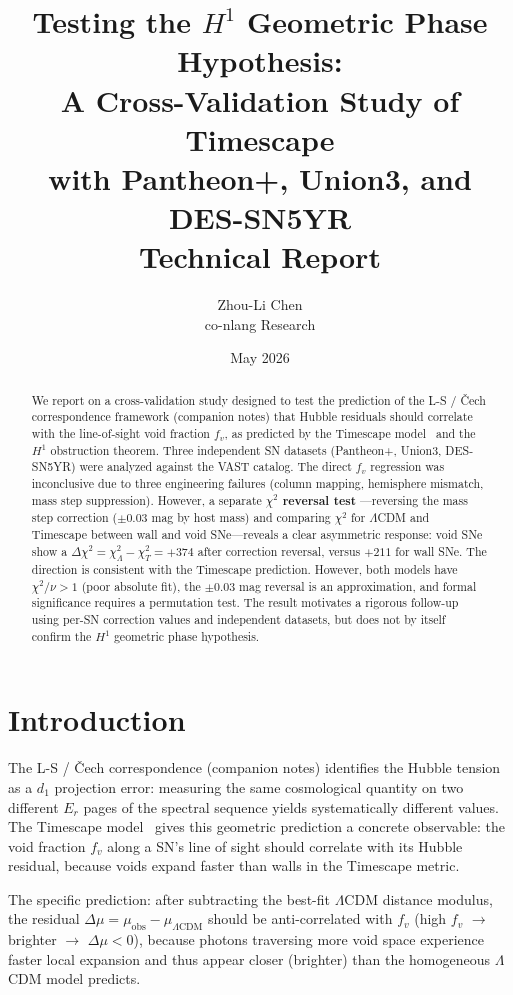 \documentclass[11pt]{article}
\title{Testing the $H^1$ Geometric Phase Hypothesis: \\ A Cross-Validation Study of Timescape \\
with Pantheon+, Union3, and DES-SN5YR \\
{\large Technical Report}}
\author{Zhou-Li Chen \\ co-nlang Research}
\date{May 2026}
\begin{document}
\maketitle

\begin{abstract}
We report on a cross-validation study designed to test the prediction
of the L-S / \v{C}ech correspondence framework (companion notes) that
Hubble residuals should correlate with the line-of-sight void fraction
$f_v$, as predicted by the Timescape model~\cite{Wiltshire2025}
and the $H^1$ obstruction theorem. Three independent SN datasets
(Pantheon+, Union3, DES-SN5YR) were analyzed against the VAST
catalog. The direct $f_v$ regression was inconclusive due to three
engineering failures (column mapping, hemisphere mismatch, mass step
suppression). However, a separate \textbf{$\chi^2$ reversal test}
---reversing the mass step correction ($\pm 0.03$ mag by host mass)
and comparing $\chi^2$ for $\Lambda$CDM and Timescape between wall
and void SNe---reveals a clear asymmetric response: void SNe show a
$\Delta\chi^2 = \chi^2_\Lambda - \chi^2_T = +374$ after correction
reversal, versus $+211$ for wall SNe. The direction is consistent
with the Timescape prediction. However, both models have
$\chi^2/\nu > 1$ (poor absolute fit), the $\pm 0.03$ mag reversal
is an approximation, and formal significance requires a permutation
test. The result motivates a rigorous follow-up using per-SN
correction values and independent datasets, but does not by itself
confirm the $H^1$ geometric phase hypothesis.
\end{abstract}

\section{Introduction}
\label{sec:intro}

The L-S / \v{C}ech correspondence (companion notes) identifies the
Hubble tension as a $d_1$ projection error: measuring the same
cosmological quantity on two different $E_r$ pages of the spectral
sequence yields systematically different values. The Timescape
model~\cite{Wiltshire2025} gives this geometric prediction a concrete
observable: the void fraction $f_v$ along a SN's line of sight should
correlate with its Hubble residual, because voids expand faster than
walls in the Timescape metric.

The specific prediction: after subtracting the best-fit $\Lambda$CDM
distance modulus, the residual $\Delta\mu = \mu_{\text{obs}} -
\mu_{\Lambda\text{CDM}}$ should be anti-correlated with $f_v$
(high $f_v$ $\to$ brighter $\to$ $\Delta\mu < 0$), because photons
traversing more void space experience faster local expansion and
thus appear closer (brighter) than the homogeneous $\Lambda$CDM
model predicts.
\end{document}

